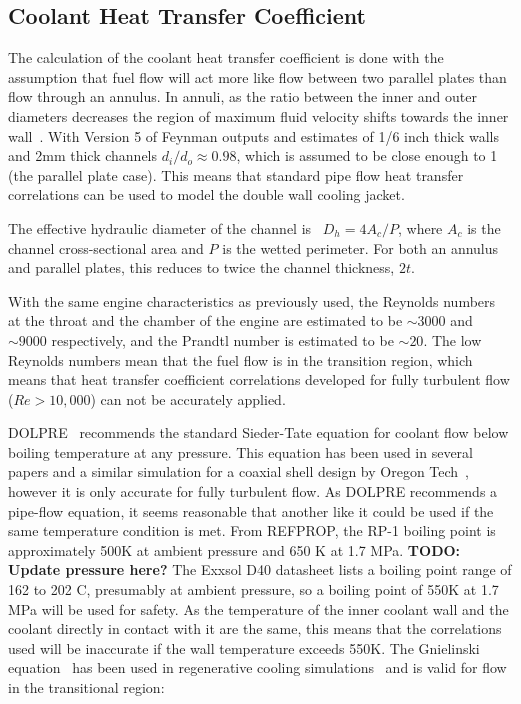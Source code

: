 \documentclass[11pt]{article}
\begin{document}
\subsection{Coolant Heat Transfer Coefficient}\label{sec:coefficient}
The calculation of the coolant heat transfer coefficient is done with the assumption that fuel flow will act more like flow between two parallel plates than flow through an annulus. In annuli, as the ratio between the inner and outer diameters decreases the region of maximum fluid velocity shifts towards the inner wall~\cite{gnielinski_heat_2009}. With Version 5 of Feynman outputs and estimates of 1/6 inch thick walls and 2mm thick channels $d_i / d_o \approx 0.98$, which is assumed to be close enough to 1 (the parallel plate case). This means that standard pipe flow heat transfer correlations can be used to model the double wall cooling jacket.

The effective hydraulic diameter of the channel is~\cite{bergman_fundamentals_2017} $D_h = 4A_c / P$, where $A_c$ is the channel cross-sectional area and $P$ is the wetted perimeter. For both an annulus and parallel plates, this reduces to twice the channel thickness, $2t$.

With the same engine characteristics as previously used, the Reynolds numbers at the throat and the chamber of the engine are estimated to be $\sim 3000$ and $\sim 9000$ respectively, and the Prandtl number is estimated to be $\sim 20$. The low Reynolds numbers mean that the fuel flow is in the transition region, which means that heat transfer coefficient correlations developed for fully turbulent flow ($Re > 10,000$) can not be accurately applied.

DOLPRE~\cite{huang_modern_1992} recommends the standard Sieder-Tate equation for coolant flow below boiling temperature at any pressure. This equation has been used in several papers and a similar simulation for a coaxial shell design by Oregon Tech~\cite{minar_our_2017}, however it is only accurate for fully turbulent flow. As DOLPRE recommends a pipe-flow equation, it seems reasonable that another like it could be used if the same temperature condition is met. From REFPROP, the RP-1 boiling point is approximately 500K at ambient pressure and 650 K at 1.7 MPa. \textbf{TODO: Update pressure here?} The Exxsol D40 datasheet lists a boiling point range of 162 to 202 C, presumably at ambient pressure, so a boiling point of 550K at 1.7 MPa will be used for safety. As the temperature of the inner coolant wall and the coolant directly in contact with it are the same, this means that the correlations used will be inaccurate if the wall temperature exceeds 550K. The Gnielinski equation~\cite{bergman_fundamentals_2017} has been used in regenerative cooling simulations~\cite{marchi_numerical_2004} and is valid for flow in the transitional region:
\end{document}
